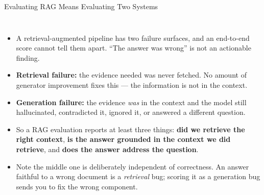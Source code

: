 \begin{frame}{Evaluating RAG Means Evaluating Two Systems}
  \begin{columns}[T,onlytextwidth]
      \begin{itemize}\footnotesize\itemsep0.32em
        \item[\textcolor{red}{$\blacktriangleright$}] A retrieval-augmented pipeline has two failure surfaces, and an end-to-end score cannot tell them apart. ``The answer was wrong'' is not an actionable finding.
        \item[\textcolor{red}{$\blacktriangleright$}] \textbf{Retrieval failure:} the evidence needed was never fetched. No amount of generator improvement fixes this --- the information is not in the context.
        \item[\textcolor{red}{$\blacktriangleright$}] \textbf{Generation failure:} the evidence \textit{was} in the context and the model still hallucinated, contradicted it, ignored it, or answered a different question.
        \item[\textcolor{red}{$\blacktriangleright$}] So a RAG evaluation reports at least three things: \textbf{did we retrieve the right context}, \textbf{is the answer grounded in the context we did retrieve}, and \textbf{does the answer address the question}.
        \item[\textcolor{red}{$\blacktriangleright$}] Note the middle one is deliberately independent of correctness. An answer faithful to a wrong document is a \textit{retrieval} bug; scoring it as a generation bug sends you to fix the wrong component.
      \end{itemize}
      \centering
      \vspace{0.6em}
\end{columns}
\end{frame}
